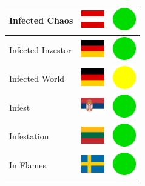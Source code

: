 \documentclass[12pt, a4paper, twoside]{report}
\begin{document}
\begin{center}
\begin{longtable}{|p{5cm}|p{2cm}|p{2cm}|}
 Infected Chaos                                             & \includegraphics[width=1cm]{../4x3/at} &   \includegraphics[width=1cm]{../likes/y} \\ \hline
 Infected Inzestor                                          & \includegraphics[width=1cm]{../4x3/de} &   \includegraphics[width=1cm]{../likes/y} \\ \hline
 Infected World                                             & \includegraphics[width=1cm]{../4x3/de} &   \includegraphics[width=1cm]{../likes/m} \\ \hline
 Infest                                                     & \includegraphics[width=1cm]{../4x3/rs} &   \includegraphics[width=1cm]{../likes/y} \\ \hline
 Infestation                                                & \includegraphics[width=1cm]{../4x3/lt} &   \includegraphics[width=1cm]{../likes/y} \\ \hline
 In Flames                                                  & \includegraphics[width=1cm]{../4x3/se} &   \includegraphics[width=1cm]{../likes/y} \\ \hline

\end{longtable}
\end{center}
\end{document}
